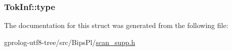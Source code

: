 \subsubsection[{\texorpdfstring{type}{type}}]{ Tok\+Inf\+::type}\hypertarget{structTokInf_a9ae46e898f23f677836fa19cc119276b}{}\label{structTokInf_a9ae46e898f23f677836fa19cc119276b}


The documentation for this struct was generated from the following file\+:\begin{DoxyCompactItemize}
\item 
gprolog-\/utf8-\/tree/src/\+Bips\+Pl/\hyperlink{scan__supp_8h}{scan\+\_\+supp.\+h}\end{DoxyCompactItemize}
